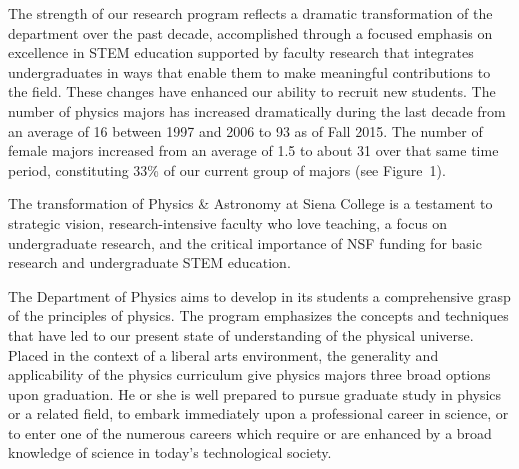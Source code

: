 \documentclass[12pt, preprint]{aastex}
\begin{document}
The strength of our research program reflects a dramatic transformation of the
department over the past decade, accomplished through a focused emphasis on
excellence in STEM education supported by faculty research that integrates
undergraduates in ways that enable them to make meaningful contributions to the
field. These changes have enhanced our ability to recruit new students.  The
number of physics majors has increased dramatically during the last decade from
an average of 16 between 1997 and 2006 to 93 as of Fall 2015. The number of
female majors increased from an average of 1.5 to about 31 over that same time
period, constituting 33\% of our current group of majors (see Figure~1).



The transformation of Physics \& Astronomy at Siena College is a testament to
strategic vision, research-intensive faculty who love teaching, a focus on
undergraduate research, and the critical importance of NSF funding for basic
research and undergraduate STEM education.



The Department of Physics aims to develop in its students a comprehensive grasp of the principles of physics. The program
emphasizes the concepts and techniques that have led to our present state of understanding of
the physical universe. Placed in the context of a liberal arts environment, the generality and
applicability of the physics curriculum give physics majors three broad options upon graduation.
He or she is well prepared to pursue graduate study in physics or a related field, to embark
immediately upon a professional career in science, or to enter one of the numerous careers which
require or are enhanced by a broad knowledge of science in today's technological society.
\end{document}
